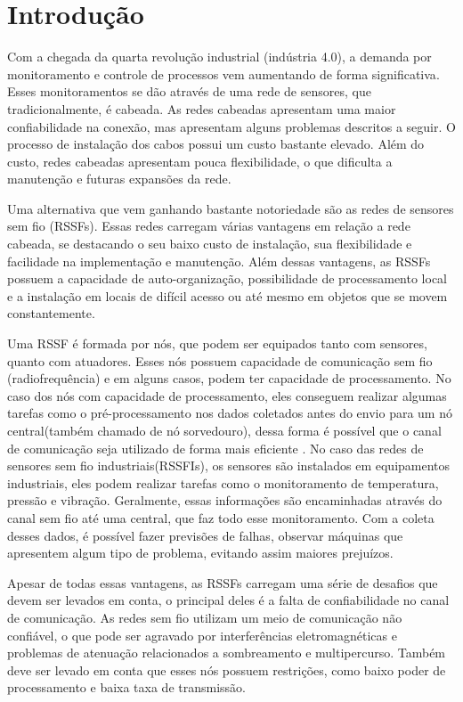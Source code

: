 \chapter[Introdução]{Introdução}
\label{cap:intro}

Com a chegada da quarta revolução industrial (indústria 4.0), a demanda por monitoramento e controle de processos vem aumentando de forma significativa\cite{klaus}. Esses monitoramentos se dão através de uma rede de sensores, que tradicionalmente, é cabeada. As redes cabeadas apresentam uma maior confiabilidade na conexão, mas apresentam alguns problemas descritos a seguir. O processo de instalação dos cabos possui um custo bastante elevado. Além do custo, redes cabeadas apresentam pouca flexibilidade, o que dificulta a manutenção e futuras expansões da rede\cite{lu2009online}.
 
Uma alternativa que vem ganhando bastante notoriedade são as redes de sensores sem fio (RSSFs). Essas redes carregam várias vantagens em relação a rede cabeada, se destacando o seu baixo custo de instalação, sua flexibilidade e facilidade na implementação e manutenção\cite{gungor2009industrial}. Além dessas vantagens, as RSSFs possuem a capacidade de auto-organização, possibilidade de processamento local e a instalação em locais de difícil acesso ou até mesmo em objetos que se movem constantemente\cite{gomes2017estimaccao}.

Uma RSSF é formada por nós, que podem ser equipados tanto com sensores, quanto com atuadores. Esses nós possuem capacidade de comunicação sem fio (radiofrequência) e em alguns casos, podem ter capacidade de processamento. No caso dos nós com capacidade de processamento, eles conseguem realizar algumas tarefas como o pré-processamento nos dados coletados antes do envio para um nó central(também chamado de nó sorvedouro), dessa forma é possível que o canal de comunicação seja utilizado de forma mais eficiente \cite{sousa2011desafios}. No caso das redes de sensores sem fio industriais(RSSFIs), os sensores são instalados em equipamentos industriais, eles podem realizar tarefas como o monitoramento de temperatura, pressão e vibração\cite{delgado2013impact}. Geralmente, essas informações são encaminhadas através do canal sem fio até uma central, que faz todo esse monitoramento. Com a coleta desses dados, é possível fazer previsões de falhas, observar máquinas que apresentem algum tipo de problema, evitando assim maiores prejuízos\cite{gungor2009industrial}. 

Apesar de todas essas vantagens, as RSSFs carregam uma série de desafios que devem ser levados em conta, o principal deles é a falta de confiabilidade no canal de comunicação. As redes sem fio utilizam um meio de comunicação não confiável, o que pode ser agravado por interferências eletromagnéticas e problemas de atenuação relacionados a sombreamento e multipercurso. Também deve ser levado em conta que esses nós possuem restrições, como baixo poder de processamento e baixa taxa de transmissão\cite{gomes2017estimaccao}. 

